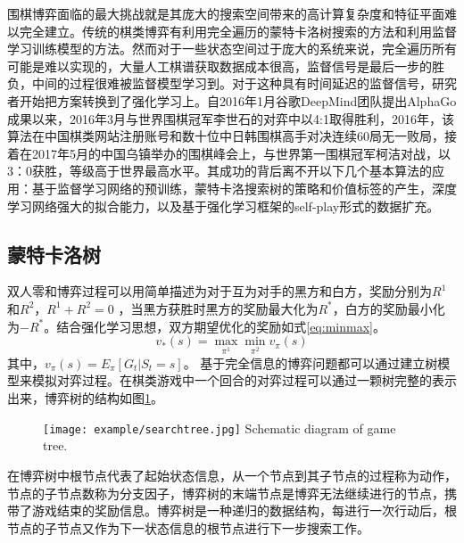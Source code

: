 围棋博弈面临的最大挑战就是其庞大的搜索空间带来的高计算复杂度和特征平面难以完全建立。传统的棋类博弈有利用完全遍历的蒙特卡洛树搜索的方法和利用监督学习训练模型的方法。然而对于一些状态空间过于庞大的系统来说，完全遍历所有可能是难以实现的，大量人工棋谱获取数据成本很高，监督信号是最后一步的胜负，中间的过程很难被监督模型学习到。对于这种具有时间延迟的监督信号，研究者开始把方案转换到了强化学习上。自2016年1月谷歌DeepMind团队提出AlphaGo成果以来，2016年3月与世界围棋冠军李世石的对弈中以4:1取得胜利，2016年，该算法在中国棋类网站注册账号和数十位中日韩围棋高手对决连续60局无一败局，接着在2017年5月的中国乌镇举办的围棋峰会上，与世界第一围棋冠军柯洁对战，以3：0获胜，等级高于世界最高水平。其成功的背后离不开以下几个基本算法的应用：基于监督学习网络的预训练，蒙特卡洛搜索树的策略和价值标签的产生，深度学习网络强大的拟合能力，以及基于强化学习框架的self-play形式的数据扩充。
\subsection{蒙特卡洛树}
双人零和博弈过程可以用简单描述为对于互为对手的黑方和白方，奖励分别为$R^1$和$R^2$，$R^1+R^2=0$ ，当黑方获胜时黑方的奖励最大化为$R^*$，白方的奖励最小化为$-R^*$。结合强化学习思想，双方期望优化的奖励如式\ref{eq:minmax}。
\begin{equation}
\label{eq:minmax}
{v_*}(s) = \mathop {\max }\limits_{{\pi ^1}} \mathop {\min }\limits_{{\pi ^2}} {v_\pi }(s)
\end{equation}
其中，${v_\pi }(s) = {E_\pi }[{G_t}|{S_t} = s]$。
基于完全信息的博弈问题都可以通过建立树模型来模拟对弈过程。在棋类游戏中一个回合的对弈过程可以通过一颗树完整的表示出来，博弈树的结构如图\ref{fig:tree}。
\begin{figure}[htbp]
	\centering
	\texttt{[image: example/searchtree.jpg]}
	{Schematic diagram of game tree.}
	\label{fig:tree}
\end{figure}

在博弈树中根节点代表了起始状态信息，从一个节点到其子节点的过程称为动作，节点的子节点数称为分支因子，博弈树的末端节点是博弈无法继续进行的节点，携带了游戏结束的奖励信息。博弈树是一种递归的数据结构，每进行一次行动后，根节点的子节点又作为下一状态信息的根节点进行下一步搜索工作。

